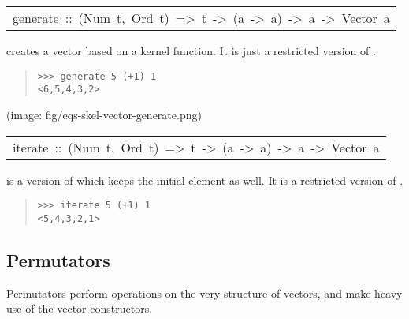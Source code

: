 \begin{haddockdesc}
\item[\begin{tabular}{@{}l}
generate\ ::\ (Num\ t,\ Ord\ t)\ =>\ t\ ->\ (a\ ->\ a)\ ->\ a\ ->\ Vector\ a
\end{tabular}]\haddockbegindoc
{} creates a vector based on a kernel function. It is
 just a restricted version of .\par
\begin{quote}
{\haddockverb\begin{verbatim}
>>> generate 5 (+1) 1
<6,5,4,3,2>

\end{verbatim}}
\end{quote}(image: fig/eqs-skel-vector-generate.png)\par
           
\end{haddockdesc}
\begin{haddockdesc}
\item[\begin{tabular}{@{}l}
iterate\ ::\ (Num\ t,\ Ord\ t)\ =>\ t\ ->\ (a\ ->\ a)\ ->\ a\ ->\ Vector\ a
\end{tabular}]\haddockbegindoc
{} is a version of  which keeps the initial
 element as well. It is a restricted version of .\par
\begin{quote}
{\haddockverb\begin{verbatim}
>>> iterate 5 (+1) 1
<5,4,3,2,1>

\end{verbatim}}
\end{quote}
\end{haddockdesc}
\subsection{Permutators}
Permutators perform operations on the very structure of
 vectors, and make heavy use of the vector constructors.\par

